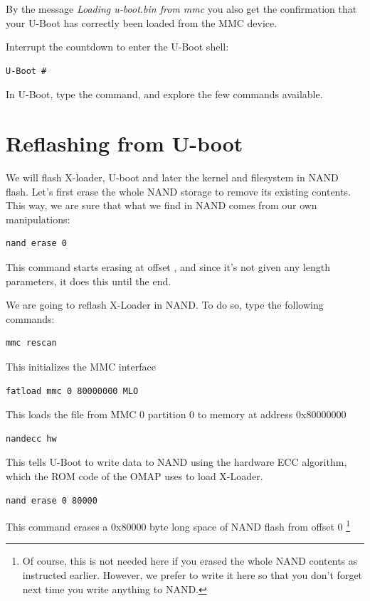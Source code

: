 By the message {\em Loading u-boot.bin from mmc} you also get the
confirmation that your U-Boot has correctly been loaded from the MMC
device.

Interrupt the countdown to enter the U-Boot shell:
\begin{verbatim}
U-Boot #
\end{verbatim}

In U-Boot, type the  command, and explore the few commands available.

\section{Reflashing from U-boot}

We will flash X-loader, U-boot and later the kernel and filesystem in
NAND flash. Let's first erase the whole NAND storage to remove its
existing contents. This way, we are sure that what we find in NAND comes
from our own manipulations:

\begin{verbatim}
nand erase 0
\end{verbatim}

This command starts erasing at offset , and since it's not given
any length parameters, it does this until the end.
 
We are going to reflash X-Loader in NAND. To do so, type the following commands:

\begin{verbatim}
mmc rescan
\end{verbatim}

This initializes the MMC interface

\begin{verbatim}
fatload mmc 0 80000000 MLO
\end{verbatim}
This loads the file from MMC 0 partition 0 to memory at address 0x80000000

\begin{verbatim}
nandecc hw
\end{verbatim}

This tells U-Boot to write data to NAND using the hardware ECC
algorithm, which the ROM code of the OMAP uses to load X-Loader.

\begin{verbatim}
nand erase 0 80000
\end{verbatim}

This command erases a 0x80000 byte long space of NAND flash from offset 0
\footnote{Of course, this is not needed here if you erased the whole NAND contents
as instructed earlier. However, we prefer to write it here so that you
don't forget next time you write anything to NAND.}

